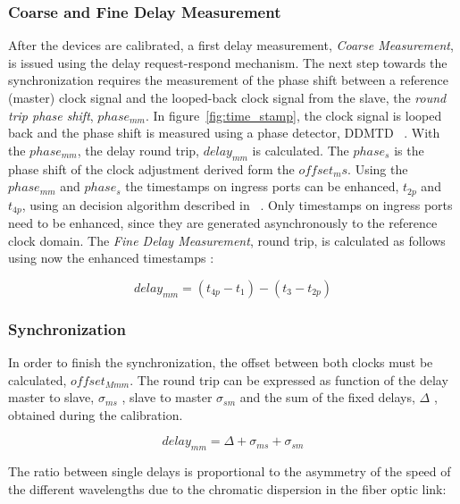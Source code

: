 \subsubsection{Coarse and Fine Delay Measurement}

After the devices are calibrated, a first delay measurement, \textit{Coarse
Measurement}, is issued using the delay request-respond mechanism. 
The next step towards the synchronization requires the measurement of the phase shift
between a reference (master) clock signal and the looped-back clock signal
from  the slave, the \textit{round trip phase shift}, $phase_{mm}$. In figure~\ref{fig:time_stamp}, 
the clock signal is looped back and the phase shift is measured 
using a phase detector, DDMTD ~\cite{biblio:ddmtd}. With the
$phase_{mm}$, the delay round trip, $delay_{mm}$ is calculated. The $phase_{s}$
is the phase shift of the clock adjustment derived form the $offset_ms$. Using the 
$phase_{mm}$ and $phase_{s}$ the timestamps on ingress ports can be enhanced,
$t_{2p}$ and  $t_{4p}$, using an decision algorithm described in ~\cite{biblio:tomas}.
Only timestamps on ingress ports need to be enhanced, since they are generated 
asynchronously to the reference clock domain. The \textit{Fine Delay Measurement}, round trip,
is calculated as follows using now the enhanced timestamps :

\begin{equation}
  \label{eq:round_trip}
    delay_{mm} = (t_{4p} - t_1) - (t_3 - t_{2p})
\end{equation}

\subsubsection{Synchronization}

In order to finish the synchronization, the offset between both clocks must be calculated, $offset_{Mmm}$. 
The round trip can be expressed as function of the  delay master to slave, $\sigma _{ms}$ , slave to
master $\sigma _{sm}$ and the sum of the fixed delays, $\Delta$ , obtained during the calibration.

\begin{equation}
  \label{eq:round_trip_2}
    delay_{mm} = \Delta + \sigma _{ms} + \sigma _{sm}
\end{equation}

The ratio between single delays is proportional to the asymmetry of the speed of
the different wavelengths due to the chromatic dispersion in the fiber optic
link:

